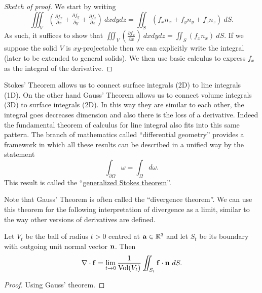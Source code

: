 \begin{proof}[Sketch of proof]
    We start by writing
    \[
        \iiint_V \left(\tfrac{\partial f_x}{\partial x} + \tfrac{\partial f_y}{\partial y} + \tfrac{\partial f_z}{\partial z} \right) \ dx dy dz = \iint_{S} \left(f_x n_x + f_y n_y + f_z n_z\right) \ dS.
    \]
    As such, it suffices to show that \(\iiint_V \left(\frac{\partial f_x}{\partial x}  \right) \ dx dy dz = \iint_{S} \left(f_x n_x \right) \ dS\).
    If we suppose the solid \(V\) is \(xy\)-projectable then we can explicitly write the integral (later to be extended to general solids).
    We then use basic calculus to express \(f_x\) as the integral of the derivative.
\end{proof}


Stokes' Theorem allows us to connect surface integrals (2D) to line integrals (1D).
On the other hand Gauss' Theorem allows us to connect volume integrals (3D) to surface integrals (2D).
In this way they are similar to each other, the integral goes decreases dimension and also there is the loss of a derivative.
Indeed the fundamental theorem of calculus for line integral also fits into this same pattern.
The branch of mathematics called ``differential geometry'' provides a framework in which all these results can be described in a unified way by the statement
\[
    \int_{\partial \Omega} \omega = \int_{\Omega} d\omega.
\]
This result is called the ``\href{https://en.wikipedia.org/wiki/Generalized_Stokes_theorem}{generalized Stokes theorem}''.

Note that Gauss' Theorem is often called the ``divergence theorem''.
We can use this theorem for the following interpretation of divergence as a limit, similar to the way other versions of derivatives are defined.

\begin{theorem*}
    Let \(V_t\) be the ball of radius \(t>0\) centred at \(\mathbf{a}\in\mathbb{R}^3\)
    and let \(S_t\) be its boundary with outgoing unit normal vector \(\mathbf{n}\).
    Then
    \[
        \nabla\cdot \ff = \lim_{t\to 0} \frac{1}{\operatorname{Vol}(V_t)} \iint_{S_t} \ff \cdot \nn \ dS.
    \]
\end{theorem*}

\begin{proof}
    Using Gauss' theorem.
\end{proof}

